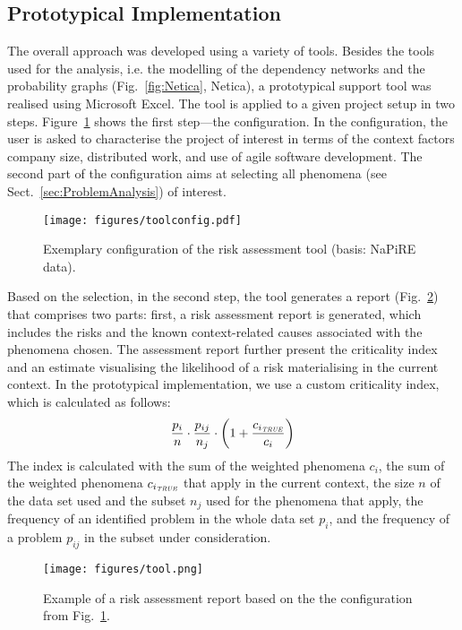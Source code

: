\documentclass[lnbip]{svmultln}
\begin{document}
\subsection{Prototypical Implementation}
\label{sec:PrototypeImpl}

The overall approach was developed using a variety of tools. Besides the tools used for the analysis, i.e. the modelling of the dependency networks and the probability graphs (Fig.~\ref{fig:Netica}, Netica), a prototypical support tool was realised using Microsoft Excel. The tool is applied to a given project setup in two steps. Figure~\ref{fig:ToolConfig} shows the first step---the configuration. In the configuration, the user is asked to characterise the project of interest in terms of the context factors company size, distributed work, and use of agile software development. The second part of the configuration aims at selecting all phenomena (see Sect.~\ref{sec:ProblemAnalysis}) of interest.
\begin{figure}[!hbtp]
\centering
  \texttt{[image: figures/toolconfig.pdf]}\\
  \caption{Exemplary configuration of the risk assessment tool (basis: NaPiRE data).}
  \label{fig:ToolConfig}
\end{figure} 

Based on the selection, in the second step, the tool generates a report (Fig.~\ref{fig:ToolResult}) that comprises two parts: first, a risk assessment report is generated, which includes the risks and the known context-related causes associated with the phenomena chosen. The assessment report further present the criticality index and an estimate visualising the likelihood of a risk materialising in the current context. In the prototypical implementation, we use a custom criticality index, which is calculated as follows:
\[
	\frac{p_{i}}{n}\cdot\frac{p_{ij}}{n_{j}}\cdot\left(1+\frac{c_{i_{\tiny\emph{TRUE}}}}{c_{i}}\right)
\]
The index is calculated with the sum of the weighted phenomena $c_{i}$, the sum of the weighted phenomena $c_{i_{\tiny\emph{TRUE}}}$ that apply in the current context, the size $n$ of the data set used and the subset $n_{j}$ used for the phenomena that apply, the frequency of an identified problem in the whole data set $p_{i}$, and the frequency of a problem $p_{ij}$ in the subset under consideration.

\begin{figure}[!hbtp]
\centering
  \texttt{[image: figures/tool.png]}\\
  \caption{Example of a risk assessment report based on the the configuration from Fig.~\ref{fig:ToolConfig}.}
  \label{fig:ToolResult}
\end{figure} 
\end{document}

